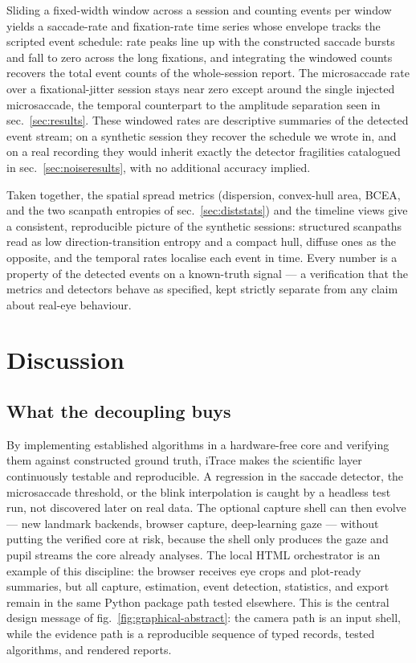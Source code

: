 \documentclass[
]{article}
\begin{document}
Sliding a fixed-width window across a session and counting events per
window yields a saccade-rate and fixation-rate time series whose
envelope tracks the scripted event schedule: rate peaks line up with the
constructed saccade bursts and fall to zero across the long fixations,
and integrating the windowed counts recovers the total event counts of
the whole-session report. The microsaccade rate over a fixational-jitter
session stays near zero except around the single injected microsaccade,
the temporal counterpart to the amplitude separation seen in
sec.~\ref{sec:results}. These windowed rates are descriptive summaries
of the detected event stream; on a synthetic session they recover the
schedule we wrote in, and on a real recording they would inherit exactly
the detector fragilities catalogued in sec.~\ref{sec:noiseresults}, with
no additional accuracy implied.

Taken together, the spatial spread metrics (dispersion, convex-hull
area, BCEA, and the two scanpath entropies of sec.~\ref{sec:diststats})
and the timeline views give a consistent, reproducible picture of the
synthetic sessions: structured scanpaths read as low
direction-transition entropy and a compact hull, diffuse ones as the
opposite, and the temporal rates localise each event in time. Every
number is a property of the detected events on a known-truth signal ---
a verification that the metrics and detectors behave as specified, kept
strictly separate from any claim about real-eye behaviour.

\section{Discussion}\label{sec:discussion}

\subsection{What the decoupling buys}\label{what-the-decoupling-buys}

By implementing established algorithms in a hardware-free core and
verifying them against constructed ground truth, iTrace makes the
scientific layer continuously testable and reproducible. A regression in
the saccade detector, the microsaccade threshold, or the blink
interpolation is caught by a headless test run, not discovered later on
real data. The optional capture shell can then evolve --- new landmark
backends, browser capture, deep-learning gaze --- without putting the
verified core at risk, because the shell only produces the gaze and
pupil streams the core already analyses. The local HTML orchestrator is
an example of this discipline: the browser receives eye crops and
plot-ready summaries, but all capture, estimation, event detection,
statistics, and export remain in the same Python package path tested
elsewhere. This is the central design message of
fig.~\ref{fig:graphical-abstract}: the camera path is an input shell,
while the evidence path is a reproducible sequence of typed records,
tested algorithms, and rendered reports.
\end{document}
